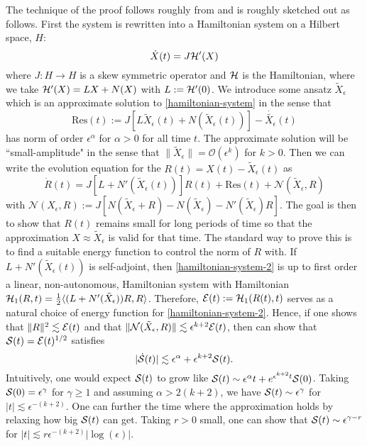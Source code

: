 The technique of the proof follows roughly from \cite{schneider2000counter,khan2017long} and is roughly sketched out as follows. First the system is rewritten into a Hamiltonian system on a Hilbert space, \(H\):
\begin{equation}\label{hamiltonian-system}
	\dot X(t) = J \mathcal{H}'(X)
\end{equation}
where \(J:H\to H\) is a skew symmetric operator and \(\mathcal{H}\) is the Hamiltonian, where we take \(\mathcal{H}'(X) = LX + N(X)\) with \(L:= \mathcal{H}'(0)\). We introduce some ansatz \(\tilde X_\epsilon\) which is an approximate solution to \cref{hamiltonian-system} in the sense that 
\begin{equation}
	\mathrm{Res}(t) := J[L\tilde X_\epsilon(t)  + N(\tilde X_\epsilon(t))] - \dot{\tilde {X_\epsilon}}(t) 
\end{equation}
has norm of order \(\epsilon^\alpha\) for \(\alpha > 0\)  for all time \(t\). The approximate solution will be ``small-amplitude" in the sense that \(\| \tilde X_\epsilon \| = \mathcal O(\epsilon^k)\) for \(k > 0 \). Then we can write the evolution equation for the \(R(t) = X(t) - \tilde X_\epsilon(t)\) as 
\begin{equation}\label{hamiltonian-system-2}
	\dot R(t) = J[L + N'(\tilde X_\epsilon(t))]R(t) + \mathrm{Res}(t) + \mathcal N(\tilde X_\epsilon, R)
\end{equation}
with \(\mathcal N( X_\epsilon, R) := J[N(\tilde X_\epsilon +R) - N(\tilde X_\epsilon) - N'(\tilde X_\epsilon)R]\). The goal is then to show that \(R(t)\) remains small for long periods of time so that the approximation \(X \approx \tilde X_\epsilon\) is valid for that time. The standard way to prove this is to find a suitable energy function to control the norm of \(R\) with. If \(L + N'(\tilde X_\epsilon(t))\) is self-adjoint, then \cref{hamiltonian-system-2} is up to first order a linear, non-autonomous, Hamiltonian system with Hamiltonian \(\mathcal{H}_1(R, t) = \frac 1 2 \langle (L+N'(\tilde X_\epsilon)) R, R\rangle\). Therefore, \(\mathcal{E}(t) := \mathcal{H}_1(R(t),t)\) serves as a natural choice of energy function for \cref{hamiltonian-system-2}. Hence, if one shows that \( \| R\|^2\lesssim\mathcal{E}(t)\) and that  \(\|\mathcal N(\tilde X_\epsilon, R) \| \lesssim \epsilon^{k+2} \mathcal{E}(t)\), then can show that \(\mathcal{S}(t) = \mathcal{E}(t)^{1/2}\) satisfies
\begin{equation}
	|\dot {\mathcal{S}} (t) | \lesssim \epsilon^{\alpha} + \epsilon^{k+2}\mathcal{S}(t).
\end{equation}
Intuitively, one would expect \(\mathcal{S}(t)\) to grow like \(\mathcal{S}(t) \sim \epsilon^\alpha t + e^{\epsilon^{k+2} t} \mathcal{S}(0)\). Taking \(\mathcal{S}(0) =\epsilon^\gamma\) for \(\gamma \geq 1\) and assuming \(\alpha > 2(k+2)\), we have \(\mathcal{S}(t) \sim \epsilon^\gamma \) for \(|t|\lesssim \epsilon^{-(k+2)}\). One can further the time where the approximation holds by relaxing how big \(\mathcal{S}(t)\) can get. Taking \(r>0\) small, one can show that \(\mathcal{S}(t) \sim \epsilon^{\gamma - r}\) for \(|t| \lesssim r \epsilon^{-(k+2)}|\log(\epsilon)|\).

